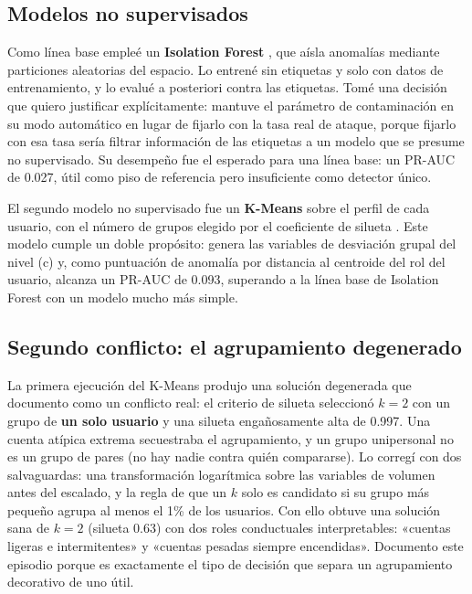 \documentclass[12pt, a4paper]{article}
\begin{document}
\subsection{Modelos no supervisados}

Como línea base empleé un \textbf{Isolation Forest} \cite{liu2008}, que aísla anomalías mediante
particiones aleatorias del espacio. Lo entrené sin etiquetas y solo con datos de entrenamiento, y lo
evalué a posteriori contra las etiquetas. Tomé una decisión que quiero justificar explícitamente:
mantuve el parámetro de contaminación en su modo automático en lugar de fijarlo con la tasa real de
ataque, porque fijarlo con esa tasa sería filtrar información de las etiquetas a un modelo que se
presume no supervisado. Su desempeño fue el esperado para una línea base: un PR-AUC de 0.027, útil
como piso de referencia pero insuficiente como detector único.

El segundo modelo no supervisado fue un \textbf{K-Means} \cite{macqueen1967} sobre el perfil de cada
usuario, con el número de grupos elegido por el coeficiente de silueta \cite{rousseeuw1987}. Este
modelo cumple un doble propósito: genera las variables de desviación grupal del nivel (c) y, como
puntuación de anomalía por distancia al centroide del rol del usuario, alcanza un PR-AUC de 0.093,
superando a la línea base de Isolation Forest con un modelo mucho más simple.

\subsection{Segundo conflicto: el agrupamiento degenerado}

La primera ejecución del K-Means produjo una solución degenerada que documento como un conflicto
real: el criterio de silueta seleccionó $k=2$ con un grupo de \textbf{un solo usuario} y una silueta
engañosamente alta de 0.997. Una cuenta atípica extrema secuestraba el agrupamiento, y un grupo
unipersonal no es un grupo de pares (no hay nadie contra quién compararse). Lo corregí con dos
salvaguardas: una transformación logarítmica sobre las variables de volumen antes del escalado, y la
regla de que un $k$ solo es candidato si su grupo más pequeño agrupa al menos el 1\% de los usuarios.
Con ello obtuve una solución sana de $k=2$ (silueta 0.63) con dos roles conductuales interpretables:
«cuentas ligeras e intermitentes» y «cuentas pesadas siempre encendidas». Documento este episodio
porque es exactamente el tipo de decisión que separa un agrupamiento decorativo de uno útil.
\end{document}
